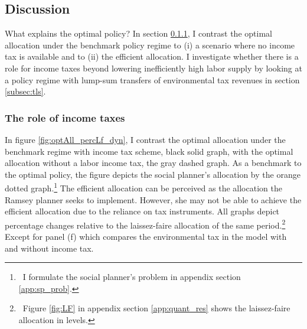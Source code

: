 %





\subsection{Discussion}\label{subsec:dis}

 What explains the optimal policy?
 In section \ref{subsec:notaul}, I contrast the optimal allocation under the benchmark policy regime to (i) a scenario where no income tax is available and to (ii) the efficient allocation. I investigate whether there is a role for income taxes beyond lowering inefficiently high labor supply by looking at a policy regime with lump-sum transfers of environmental tax revenues in section \ref{subsec:tls}. 

\subsubsection{The role of income taxes}\label{subsec:notaul}

In figure \ref{fig:optAll_percLf_dyn}, I contrast the optimal allocation under the benchmark regime with income tax scheme, black solid graph, with the optimal allocation without a labor income tax, the gray dashed graph. As a benchmark to the optimal policy, the figure depicts the social planner's allocation by the orange dotted graph.\footnote{\ I formulate the social planner's problem in appendix section \ref{app:sp_prob}.} 
The efficient allocation can be perceived as the allocation the Ramsey planner seeks to implement. However, she may not be able to achieve the efficient allocation due to the reliance on tax instruments.
All graphs depict percentage changes relative to the laissez-faire allocation of the same period.\footnote{\ Figure \ref{fig:LF} in appendix section \ref{app:quant_res} shows the laissez-faire allocation in levels. } Except for panel (f) which compares the environmental tax in the model with and without income tax. 

